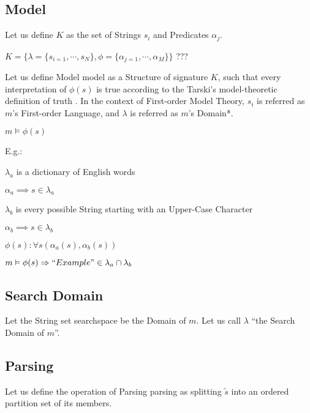 \documentclass{article}
\begin{document}
\subsection{Model}

Let us define $K$ as the set of Strings $s_i$ and Predicates $\alpha_j$.

\begin{center}
 $K = \{\lambda=\{s_{i=1}, \cdots, s_N\}, \phi = \{\alpha_{j=1}, \cdots, \alpha_M\}\}$ ???
\end{center}

Let us define Model \gls{model} as a Structure of signature $K$, such that every interpretation of $\phi(s)$ is true according to the  Tarski's model-theoretic definition of truth \cite{?}.
In the context of First-order Model Theory, $s_i$ is referred as $m$'s First-order Language, and $\lambda$ is referred as $m$'s Domain*.

\begin{center}
 $m \vDash \phi(s)$
\end{center}

E.g.: 

\begin{center}
$\lambda_a$ is a dictionary of English words

$\alpha_a \implies s \in \lambda_a$

$\lambda_b$ is every possible String starting with an Upper-Case Character

$\alpha_b \implies s \in \lambda_b$

$\phi(s) : \forall  s(\alpha_a(s), \alpha_b(s))$

$m \vDash \phi(s) \Rightarrow ``Example" \in \lambda_a \cap \lambda_b$

\end{center}


\subsection{Search Domain}

Let the String set \gls{searchspace} be the Domain of $m$. Let us call $\lambda$ ``the Search Domain of $m$''.

\subsection{Parsing}

Let us define the operation of Parsing \gls{parsing} as splitting $\tilde s$ into an ordered partition set of its members.
\end{document}
